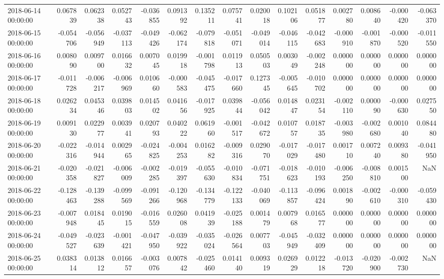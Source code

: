 \begin{tabular}{lrrrrrrrrrrrrrr}
2018-06-14 00:00:00 & 0.067839 & 0.062338 & 0.052743 & -0.036855 & 0.091392 & 0.135211 & 0.075741 & 0.020018 & 0.102106 & 0.051877 & 0.002780 & 0.008640 & -0.000420 & -0.063370 \\
2018-06-15 00:00:00 & -0.054706 & -0.056949 & -0.037113 & -0.049426 & -0.062174 & -0.079818 & -0.051071 & -0.049014 & -0.046115 & -0.042683 & -0.000910 & -0.001870 & -0.000520 & -0.011550 \\
2018-06-16 00:00:00 & 0.008090 & 0.009700 & 0.016632 & 0.007045 & 0.019918 & -0.001798 & 0.011913 & 0.050503 & 0.003049 & -0.002248 & 0.000000 & 0.000000 & 0.000000 & 0.000000 \\
2018-06-17 00:00:00 & -0.011728 & -0.006217 & -0.006969 & 0.010660 & -0.000583 & -0.045475 & -0.017660 & 0.127345 & -0.005645 & -0.010702 & 0.000000 & 0.000000 & 0.000000 & 0.000000 \\
2018-06-18 00:00:00 & 0.026234 & 0.045346 & 0.039803 & 0.014502 & 0.041656 & -0.017925 & 0.039844 & -0.056042 & 0.014847 & 0.023154 & -0.002110 & 0.000090 & -0.000630 & 0.027550 \\
2018-06-19 00:00:00 & 0.009130 & 0.022977 & 0.003941 & 0.020793 & 0.040222 & 0.061960 & -0.001517 & -0.042672 & 0.010757 & 0.018735 & -0.003980 & -0.002680 & 0.001040 & 0.084480 \\
2018-06-20 00:00:00 & -0.022316 & -0.014944 & 0.002965 & -0.024825 & -0.004253 & 0.016282 & -0.009316 & 0.029070 & -0.017029 & -0.017480 & 0.001710 & 0.007240 & 0.009380 & -0.041950 \\
2018-06-21 00:00:00 & -0.020358 & -0.021827 & -0.006009 & -0.002285 & -0.019397 & -0.055630 & -0.010834 & -0.071751 & -0.018623 & -0.010193 & -0.006250 & -0.008810 & 0.001500 & NaN \\
2018-06-22 00:00:00 & -0.128463 & -0.139288 & -0.099569 & -0.091266 & -0.120968 & -0.134779 & -0.122133 & -0.040069 & -0.113857 & -0.096424 & 0.001890 & -0.002610 & -0.000310 & -0.059430 \\
2018-06-23 00:00:00 & -0.007948 & 0.018445 & 0.019015 & -0.016559 & 0.026008 & 0.041939 & -0.025188 & 0.001479 & 0.007968 & 0.016577 & 0.000000 & 0.000000 & 0.000000 & 0.000000 \\
2018-06-24 00:00:00 & -0.049527 & -0.023639 & -0.001421 & -0.047950 & -0.039922 & -0.035024 & -0.026564 & 0.007703 & -0.045949 & -0.032409 & 0.000000 & 0.000000 & 0.000000 & 0.000000 \\
2018-06-25 00:00:00 & 0.038314 & 0.013812 & 0.016657 & -0.003076 & 0.007842 & -0.025460 & 0.014140 & 0.009319 & 0.026929 & 0.012218 & -0.013720 & -0.020900 & -0.002730 & NaN \\

\end{tabular}
